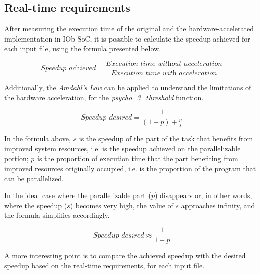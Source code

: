 \subsection{Real-time requirements}


After measuring the execution time of the original and the hardware-accelerated implementation in IOb-SoC, it is possible to calculate the speedup achieved for each input file, using the formula presented below.

\begin{equation}
    \textit{Speedup achieved} = \frac{\textit{Execution time without acceleration}}{\textit{Execution time with acceleration}} 
\end{equation}

Additionally, the \textit{Amdahl's Law} can be applied to understand the limitations of the hardware acceleration, for the \textit{psycho\_3\_threshold} function.

\begin{equation}
    \textit{Speedup desired} = \frac{1}{(1 - p) + \frac{p}{s}} 
\end{equation}

In the formula above, $s$ is the speedup of the part of the task that benefits from improved system resources, i.e. is the speedup achieved on the parallelizable portion; $p$ is the proportion of execution time that the part benefiting from improved resources originally occupied, i.e. is the proportion of the program that can be parallelized.

In the ideal case where the parallelizable part ($p$) disappears or, in other words, where the speedup ($s$) becomes very high, the value of $s$ approaches infinity, and the formula simplifies accordingly.

\begin{equation}
    \textit{Speedup desired} \approx \frac{1}{1 - p}
\end{equation}

A more interesting point is to compare the achieved speedup with the desired speedup based on the real-time requirements, for each input file. 

